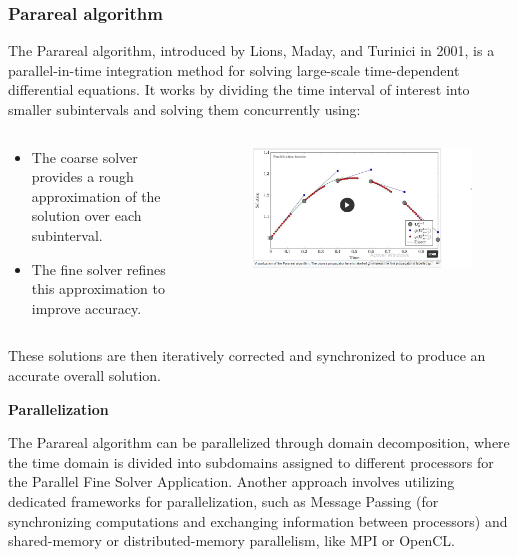 \documentclass[
	11pt,
]{beamer}
\newcommand\myheading[1]{%
  \par\bigskip
  {\Large\bfseries#1}\par\smallskip}
\begin{document}
\begin{frame}
    \frametitle{Parareal algorithm}
    The Parareal algorithm, introduced by Lions, Maday, and Turinici in 2001, is a parallel-in-time integration method for solving large-scale time-dependent differential equations.
    \vspace{\baselineskip}
    It works by dividing the time interval of interest into smaller subintervals and
    solving them concurrently using:
    \begin{columns}[c]
        \begin{column}{0.45\textwidth}
            \begin{itemize}
                \item The coarse solver provides a rough approximation of the solution over each subinterval.
                \item The fine solver refines this approximation to improve accuracy.
            \end{itemize}
        \end{column}
        \begin{column}{0.5\textwidth}
            \begin{figure}
                \includegraphics[width=1.\linewidth]{parareal.png}
            \end{figure}
        \end{column}
    \end{columns}
    These solutions are then iteratively corrected and synchronized to produce an accurate overall solution.
\end{frame}
   \begin{frame}
   \myheading{Parallelization}  
    The Parareal algorithm can be parallelized through domain decomposition, where the time domain is divided into subdomains assigned to different processors for the Parallel Fine Solver Application. Another approach involves utilizing dedicated frameworks for parallelization, such as Message Passing (for synchronizing computations and exchanging information between processors) and shared-memory or distributed-memory parallelism, like MPI or OpenCL.
   \end{frame}
\end{document}
